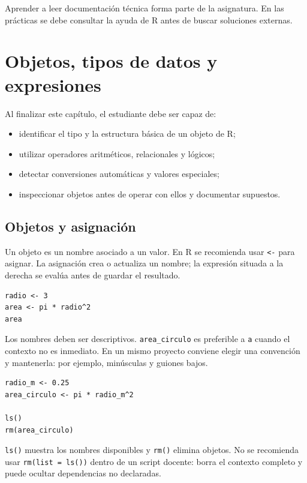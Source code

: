 \documentclass[11pt,a4paper,oneside]{book}
\begin{document}
\begin{aviso}
Aprender a leer documentación técnica forma parte de la asignatura. En las prácticas se debe consultar la ayuda de R antes de buscar soluciones externas.
\end{aviso}

\chapter{Objetos, tipos de datos y expresiones}

\begin{objetivos}
Al finalizar este capítulo, el estudiante debe ser capaz de:
\begin{itemize}
  \item identificar el tipo y la estructura básica de un objeto de R;
  \item utilizar operadores aritméticos, relacionales y lógicos;
  \item detectar conversiones automáticas y valores especiales;
  \item inspeccionar objetos antes de operar con ellos y documentar supuestos.
\end{itemize}
\end{objetivos}

\section{Objetos y asignación}
Un objeto es un nombre asociado a un valor. En R se recomienda usar \texttt{<-} para asignar. La asignación crea o actualiza un nombre; la expresión situada a la derecha se evalúa antes de guardar el resultado.

\begin{lstlisting}[style=rstyle]
radio <- 3
area <- pi * radio^2
area
\end{lstlisting}

Los nombres deben ser descriptivos. \texttt{area\_circulo} es preferible a \texttt{a} cuando el contexto no es inmediato. En un mismo proyecto conviene elegir una convención y mantenerla: por ejemplo, minúsculas y guiones bajos.

\begin{lstlisting}[style=rstyle]
radio_m <- 0.25
area_circulo <- pi * radio_m^2

ls()
rm(area_circulo)
\end{lstlisting}

\texttt{ls()} muestra los nombres disponibles y \texttt{rm()} elimina objetos. No se recomienda usar \texttt{rm(list = ls())} dentro de un script docente: borra el contexto completo y puede ocultar dependencias no declaradas.
\end{document}
